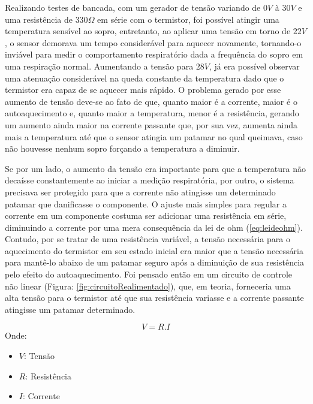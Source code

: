 Realizando testes de bancada, com um gerador de tensão variando de $0V$ à $30V$ e uma resistência de $330\Omega$ em série com o termistor, foi possível atingir uma temperatura sensível ao sopro, entretanto, ao aplicar uma tensão em torno de $22V$, o sensor demorava um tempo considerável para aquecer novamente, tornando-o inviável para medir o comportamento respiratório dada a frequência do sopro em uma respiração normal. Aumentando a tensão para $28V$, já era possível observar uma atenuação considerável na queda constante da temperatura dado que o termistor era capaz de se aquecer mais rápido. O problema gerado por esse aumento de tensão deve-se ao fato de que, quanto maior é a corrente, maior é o autoaquecimento e, quanto maior a temperatura, menor é a resistência, gerando um aumento ainda maior na corrente passante que, por sua vez, aumenta ainda mais a temperatura até que o sensor atingia um patamar no qual queimava, caso não houvesse nenhum sopro forçando a temperatura a diminuir. 
 
Se por um lado, o aumento da tensão era importante para que a temperatura não decaísse constantemente ao iniciar a medição respiratória, por outro, o sistema precisava ser protegido para que a corrente não atingisse um determinado patamar que danificasse o componente. O ajuste mais simples para regular a corrente em um componente costuma ser adicionar uma resistência em série, diminuindo a corrente por uma mera consequência da lei de ohm (\ref{eq:leideohm}). Contudo, por se tratar de uma resistência variável, a tensão necessária para o aquecimento do termistor em seu estado inicial era maior que a tensão necessária para mantê-lo abaixo de um patamar seguro após a diminuição de sua resistência pelo efeito do autoaquecimento. Foi pensado então em um circuito de controle não linear (Figura: \ref{fig:circuitoRealimentado}), que, em teoria, forneceria uma alta tensão para o termistor até que sua resistência variasse e a corrente passante atingisse um patamar determinado. 
  
\begin{equation} \label{eq:leideohm}
	V = R.I
\end{equation}
Onde:
\begin{itemize}[label=]
  	\item $V$: Tensão
  	\item $R$: Resistência
  	\item $I$: Corrente
\end{itemize}

